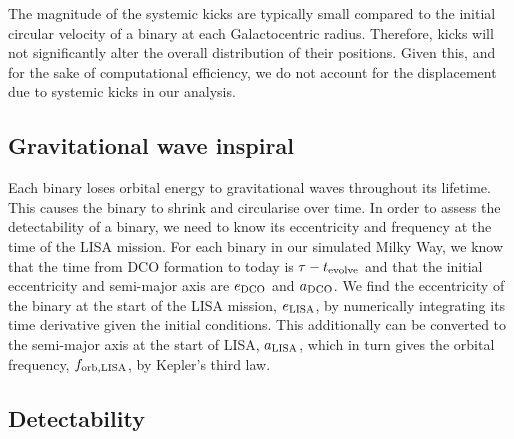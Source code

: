 The magnitude of the systemic kicks are typically small compared to the initial circular velocity of a binary at each Galactocentric radius. Therefore, kicks will not significantly alter the overall distribution of their positions. Given this, and for the sake of computational efficiency, we do not account for the displacement due to systemic kicks in our analysis.

\subsection{Gravitational wave inspiral}

Each binary loses orbital energy to gravitational waves throughout its lifetime. This causes the binary to shrink and circularise over time. In order to assess the detectability of a binary, we need to know its eccentricity and frequency at the time of the LISA mission. For each binary in our simulated Milky Way, we know that the time from DCO formation to today is $\tau - t_{\rm evolve}$ and that the initial eccentricity and semi-major axis are $e_{\rm DCO}$ and $a_{\rm DCO}$. We find the eccentricity of the binary at the start of the LISA mission, $e_{\rm LISA}$, by numerically integrating its time derivative \citep[][Eq. 5.13]{Peters+1964} given the initial conditions. This additionally can be converted to the semi-major axis at the start of LISA, $a_{\rm LISA} $\citep[][Eq. 5.11]{Peters+1964}, which in turn gives the orbital frequency, $f_{\rm orb, LISA}$, by Kepler's third law.

\subsection{Detectability}

